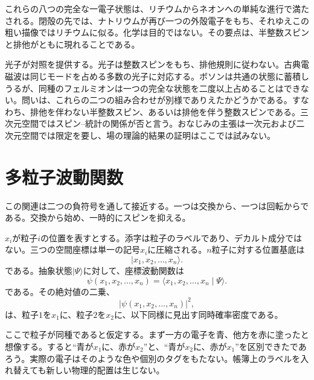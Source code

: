 これらの八つの完全な一電子状態は、リチウムからネオンへの単純な進行で満たされる。閉殻の先では、ナトリウムが再び一つの外殻電子をもち、それゆえこの粗い描像ではリチウムに似る。化学は目的ではない。その要点は、半整数スピンと排他がともに現れることである。

光子が対照を提供する。光子は整数スピンをもち、排他規則に従わない。古典電磁波は同じモードを占める多数の光子に対応する。ボソンは共通の状態に蓄積しうるが、同種のフェルミオンは一つの完全な状態を二度以上占めることはできない。問いは、これらの二つの組み合わせが別様でありえたかどうかである。すなわち、排他を伴わない半整数スピン、あるいは排他を伴う整数スピンである。三次元空間ではスピン--統計の関係が否と言う。おなじみの主張は一次元および二次元空間では限定を要し、場の理論的結果の証明はここでは試みない。

\begin{classroomqa}
\end{classroomqa}

\section{多粒子波動関数}

この関連は二つの負符号を通して接近する。一つは交換から、一つは回転からである。交換から始め、一時的にスピンを抑える。

\(x_i\)が粒子\(i\)の位置を表すとする。添字は粒子のラベルであり、デカルト成分ではない。三つの空間座標は単一の記号\(x_i\)に圧縮される。\(n\)粒子に対する位置基底は
\begin{equation}
\lvert x_1,x_2,\ldots,x_n\rangle.
\end{equation}
である。抽象状態\(\lvert\Psi\rangle\)に対して、座標波動関数は
\begin{equation}
\psi(x_1,x_2,\ldots,x_n)
=
\langle x_1,x_2,\ldots,x_n\mid\Psi\rangle.
\end{equation}
である。その絶対値の二乗、
\begin{equation}
\bigl\lvert\psi(x_1,x_2,\ldots,x_n)\bigr\rvert^2,
\end{equation}
は、粒子\(1\)を\(x_1\)に、粒子\(2\)を\(x_2\)に、以下同様に見出す同時確率密度である。

ここで粒子が同種であると仮定する。まず一方の電子を青、他方を赤に塗ったと想像する。すると``青が\(x_1\)に、赤が\(x_2\)''と、``青が\(x_2\)に、赤が\(x_1\)''を区別できたであろう。実際の電子はそのような色や個別のタグをもたない。帳簿上のラベルを入れ替えても新しい物理的配置は生じない。

